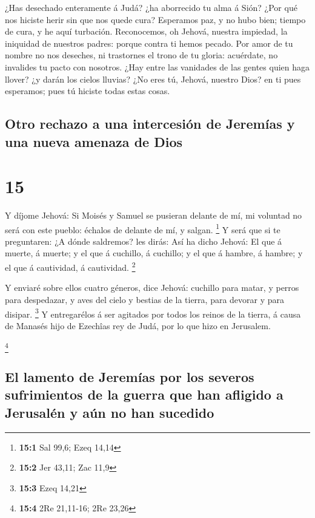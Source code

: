  ¿Has desechado enteramente á Judá? ¿ha aborrecido tu alma
á Sión? ¿Por qué nos hiciste herir sin que nos quede cura? Esperamos
paz, y no hubo bien; tiempo de cura, y he aquí turbación. 
Reconocemos, oh Jehová, nuestra impiedad, la iniquidad de nuestros
padres: porque contra ti hemos pecado.  Por amor de tu
nombre no nos deseches, ni trastornes el trono de tu gloria: acuérdate,
no invalides tu pacto con nosotros.  ¿Hay entre las
vanidades de las gentes quien haga llover? ¿y darán los cielos lluvias?
¿No eres tú, Jehová, nuestro Dios? en ti pues esperamos; pues tú hiciste
todas estas cosas.

\hypertarget{otro-rechazo-a-una-intercesiuxf3n-de-jeremuxedas-y-una-nueva-amenaza-de-dios}{%
\subsection{Otro rechazo a una intercesión de Jeremías y una nueva
amenaza de
Dios}\label{otro-rechazo-a-una-intercesiuxf3n-de-jeremuxedas-y-una-nueva-amenaza-de-dios}}

\hypertarget{section-14}{%
\section{15}\label{section-14}}

 Y díjome Jehová: Si Moisés y Samuel se pusieran delante de
mí, mi voluntad no será con este pueblo: échalos de delante de mí, y
salgan. \footnote{\textbf{15:1} Sal 99,6; Ezeq 14,14}  Y
será que si te preguntaren: ¿A dónde saldremos? les dirás: Así ha dicho
Jehová: El que á muerte, á muerte; y el que á cuchillo, á cuchillo; y el
que á hambre, á hambre; y el que á cautividad, á cautividad. \footnote{\textbf{15:2}
  Jer 43,11; Zac 11,9}

 Y enviaré sobre ellos cuatro géneros, dice Jehová: cuchillo
para matar, y perros para despedazar, y aves del cielo y bestias de la
tierra, para devorar y para disipar. \footnote{\textbf{15:3} Ezeq 14,21}
 Y entregarélos á ser agitados por todos los reinos de la
tierra, á causa de Manasés hijo de Ezechîas rey de Judá, por lo que hizo
en Jerusalem.

\footnote{\textbf{15:4} 2Re 21,11-16; 2Re 23,26}

\hypertarget{el-lamento-de-jeremuxedas-por-los-severos-sufrimientos-de-la-guerra-que-han-afligido-a-jerusaluxe9n-y-auxfan-no-han-sucedido}{%
\subsection{El lamento de Jeremías por los severos sufrimientos de la
guerra que han afligido a Jerusalén y aún no han
sucedido}\label{el-lamento-de-jeremuxedas-por-los-severos-sufrimientos-de-la-guerra-que-han-afligido-a-jerusaluxe9n-y-auxfan-no-han-sucedido}}

